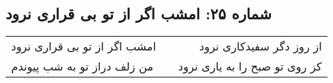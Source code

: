 \begin{center}
\section*{شماره ۲۵: امشب اگر از تو بی قراری نرود}
\label{sec:025}
\begin{longtable}{l p{0.5cm} r}
امشب اگر از تو بی قراری نرود
&&
از روز دگر سفیدکاری نرود
\\
من زلف دراز تو به شب پیوندم
&&
کز روی تو صبح را به یاری نرود
\\
\end{longtable}
\end{center}

